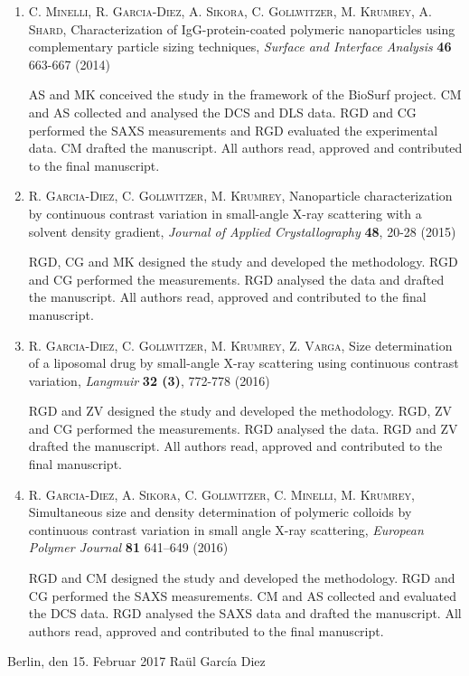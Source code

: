 \begin{enumerate}

    \item \textsc{C. Minelli, R. Garcia-Diez, A. Sikora, C. Gollwitzer, M. Krumrey, A. Shard}, Characterization of IgG-protein-coated polymeric nanoparticles using complementary particle sizing techniques, \emph{Surface and Interface Analysis} \textbf{46} 663-667 (2014)

        \hspace{10pt} AS and MK conceived the study in the framework of the BioSurf project. CM and AS collected and analysed the DCS and DLS data. RGD and CG performed the SAXS measurements and RGD evaluated the experimental data. CM drafted the manuscript. All authors read, approved and contributed to the final manuscript.

    \item \textsc{R. Garcia-Diez, C. Gollwitzer, M. Krumrey}, Nanoparticle characterization by continuous contrast variation in small-angle {{X}}-ray scattering with a solvent density gradient, \emph{Journal of Applied Crystallography} \textbf{48}, 20-28 (2015)

        \hspace{10pt} RGD, CG and MK designed the study and developed the methodology. RGD and CG performed the measurements. RGD analysed the data and drafted the manuscript. All authors read, approved and contributed to the final manuscript.

    \item \textsc{R. Garcia-Diez, C. Gollwitzer, M. Krumrey, Z. Varga}, Size determination of a liposomal drug by small-angle X-ray scattering using continuous contrast variation, \emph{Langmuir} \textbf{32 (3)}, 772-778 (2016)

        \hspace{10pt} RGD and ZV designed the study and developed the methodology. RGD, ZV and CG performed the measurements. RGD analysed the data. RGD and ZV drafted the manuscript. All authors read, approved and contributed to the final manuscript.
        
    \item \textsc{R. Garcia-Diez, A. Sikora, C. Gollwitzer, C. Minelli, M. Krumrey}, Simultaneous size and density determination of polymeric colloids by continuous contrast variation in small angle {{X}}-ray scattering, \emph{European Polymer Journal} \textbf{81} 641–649 (2016) 

        \hspace{10pt} RGD and CM designed the study and developed the methodology. RGD and CG performed the SAXS measurements. CM and AS collected and evaluated the DCS data. RGD analysed the SAXS data and drafted the manuscript. All authors read, approved and contributed to the final manuscript.

\end{enumerate}

\vspace{3cm}

\noindent Berlin, den 15. Februar 2017 \hfill Raül Garc\'{i}a Diez

\cleardoublepage
